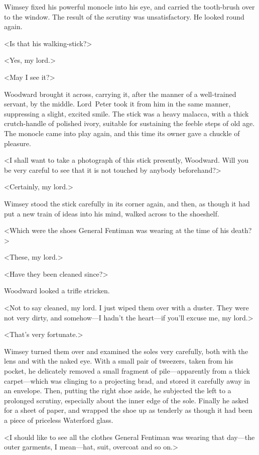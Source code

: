 Wimsey fixed his powerful monocle into his eye, and carried the tooth-brush over to the window. The result of the scrutiny was unsatisfactory. He looked round again.

<Is that his walking-stick?>

<Yes, my lord.>

<May I see it?>

Woodward brought it across, carrying it, after the manner of a well-trained servant, by the middle. Lord~Peter took it from him in the same manner, suppressing a slight, excited smile. The stick was a heavy malacca, with a thick crutch-handle of polished ivory, suitable for sustaining the feeble steps of old age. The monocle came into play again, and this time its owner gave a chuckle of pleasure.

<I shall want to take a photograph of this stick presently, Woodward. Will you be very careful to see that it is not touched by anybody beforehand?>

<Certainly, my lord.>

Wimsey stood the stick carefully in its corner again, and then, as though it had put a new train of ideas into his mind, walked across to the shoeshelf.

<Which were the shoes General Fentiman was wearing at the time of his death?>

<These, my lord.>

<Have they been cleaned since?>

Woodward looked a trifle stricken.

<Not to say cleaned, my lord. I just wiped them over with a duster. They were not very dirty, and somehow—I hadn't the heart—if you'll excuse me, my lord.>

<That's very fortunate.>

Wimsey turned them over and examined the soles very carefully, both with the lens and with the naked eye. With a small pair of tweezers, taken from his pocket, he delicately removed a small fragment of pile—apparently from a thick carpet—which was clinging to a projecting brad, and stored it carefully away in an envelope. Then, putting the right shoe aside, he subjected the left to a prolonged scrutiny, especially about the inner edge of the sole. Finally he asked for a sheet of paper, and wrapped the shoe up as tenderly as though it had been a piece of priceless Waterford glass.

<I should like to see all the clothes General Fentiman was wearing that day—the outer garments, I mean—hat, suit, overcoat and so on.>

